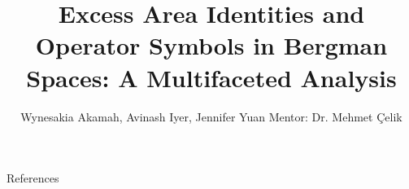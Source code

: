 \documentclass{reu_beamer}
\title[]{Excess Area Identities and Operator Symbols in Bergman Spaces: A Multifaceted Analysis}
\author{
    Wynesakia Akamah, Avinash Iyer, Jennifer Yuan
    Mentor: Dr. Mehmet \c{C}elik
}
\institute{Department of Mathematics, Texas A\&M University-Commerce}
\begin{document}
\begin{frame}[allowframebreaks]{References}
\nocite{*}

{\tiny}
\end{frame}

\end{document}
